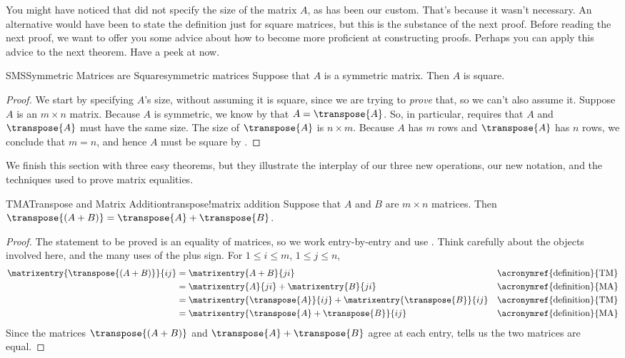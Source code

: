 %
You might have noticed that  did not specify the size of the matrix $A$, as has been our custom.  That's because it wasn't necessary.  An alternative would have been to state the definition just for square matrices, but this is the substance of the next proof.  
%
{Before reading the next proof, we want to offer you some advice about how to become more proficient at constructing proofs.  Perhaps you can apply this advice to the next theorem.}
{Have a peek at  now.}
%
\begin{theorem}{SMS}{Symmetric Matrices are Square}{symmetric matrices}
Suppose that $A$ is a symmetric matrix.  Then $A$ is square.
\end{theorem}
%
\begin{proof}
We start by specifying $A$'s size, without assuming it is square, since we are trying to {\em prove} that, so we can't also assume it.  Suppose $A$ is an $m\times n$ matrix.  Because $A$ is symmetric, we know by  that $A=\transpose{A}$.  So, in particular,  requires that $A$ and $\transpose{A}$ must have the same size.  The size of $\transpose{A}$ is $n\times m$.  Because $A$ has $m$ rows and $\transpose{A}$ has $n$ rows, we conclude that $m=n$, and hence $A$ must be square by .
\end{proof}
%
We finish this section with three easy theorems, but they illustrate the interplay of our three new operations, our new notation, and the techniques used to prove matrix equalities.
%
\begin{theorem}{TMA}{Transpose and Matrix Addition}{transpose!matrix addition}
Suppose that $A$ and $B$ are $m\times n$ matrices.  Then  $\transpose{(A+B)}=\transpose{A}+\transpose{B}$.
%
\end{theorem}
%
\begin{proof}
The statement  to be proved is an equality of matrices, so we work entry-by-entry and use .  Think carefully about the objects involved here, and the many uses of the plus sign.  For $1\leq i\leq m$, $1\leq j\leq n$,
%
\begin{align*}
\matrixentry{\transpose{(A+B)}}{ij}
&=\matrixentry{A+B}{ji}&&\text{\acronymref{definition}{TM}}\\
&=\matrixentry{A}{ji}+\matrixentry{B}{ji}&&\text{\acronymref{definition}{MA}}\\
&=\matrixentry{\transpose{A}}{ij}+\matrixentry{\transpose{B}}{ij}&&\text{\acronymref{definition}{TM}}\\
&=\matrixentry{\transpose{A}+\transpose{B}}{ij}&&\text{\acronymref{definition}{MA}}
%
\end{align*}
%
Since the matrices $\transpose{(A+B)}$ and $\transpose{A}+\transpose{B}$ agree at each entry,  tells us the two matrices are equal.
%
\end{proof}
